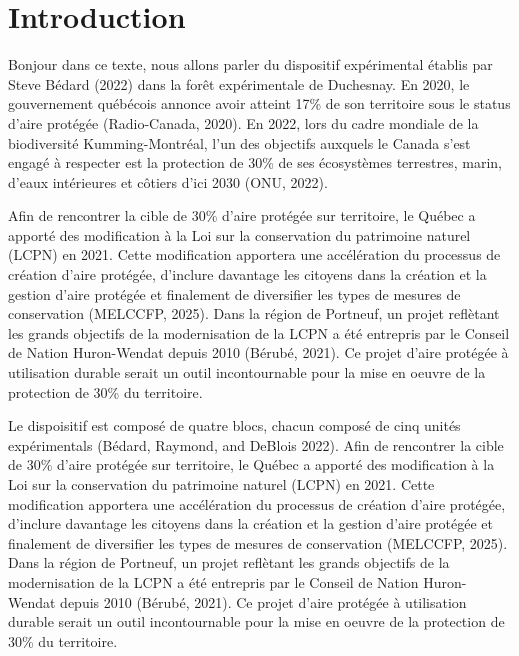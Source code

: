 \documentclass[
  12pt,
]{article}
\renewcommand*\contentsname{Table of contents}
\newcommand\contentsname{Table of contents}
\renewcommand*\listfigurename{List of Figures}
\newcommand\listfigurename{List of Figures}
\renewcommand*\listtablename{List of Tables}
\newcommand\listtablename{List of Tables}
\renewcommand*\figurename{Figure}
\newcommand\figurename{Figure}
\renewcommand*\tablename{Table}
\newcommand\tablename{Table}
\begin{document}

\renewcommand*\contentsname{Table des matieres}
\tableofcontents

\newpage

\renewcommand\listfigurename{Liste des figures}
\listoffigures

\renewcommand\listtablename{Liste des tableaux}
\listoftables

\newpage

\setcounter{page}{1}
\renewcommand\tablename{Tableau}
\renewcommand\figurename{Figure}
\section{Introduction}\label{introduction}

Bonjour dans ce texte, nous allons parler du dispositif expérimental
établis par Steve Bédard (2022) dans la forêt expérimentale de
Duchesnay. En 2020, le gouvernement québécois annonce avoir atteint 17\%
de son territoire sous le status d'aire protégée (Radio-Canada, 2020).
En 2022, lors du cadre mondiale de la biodiversité Kumming-Montréal,
l'un des objectifs auxquels le Canada s'est engagé à respecter est la
protection de 30\% de ses écosystèmes terrestres, marin, d'eaux
intérieures et côtiers d'ici 2030 (ONU, 2022).

Afin de rencontrer la cible de 30\% d'aire protégée sur territoire, le
Québec a apporté des modification à la Loi sur la conservation du
patrimoine naturel (LCPN) en 2021. Cette modification apportera une
accélération du processus de création d'aire protégée, d'inclure
davantage les citoyens dans la création et la gestion d'aire protégée et
finalement de diversifier les types de mesures de conservation (MELCCFP,
2025). Dans la région de Portneuf, un projet reflètant les grands
objectifs de la modernisation de la LCPN a été entrepris par le Conseil
de Nation Huron-Wendat depuis 2010 (Bérubé, 2021). Ce projet d'aire
protégée à utilisation durable serait un outil incontournable pour la
mise en oeuvre de la protection de 30\% du territoire.

Le dispoisitif est composé de quatre blocs, chacun composé de cinq
unités expérimentals (Bédard, Raymond, and DeBlois 2022). Afin de
rencontrer la cible de 30\% d'aire protégée sur territoire, le Québec a
apporté des modification à la Loi sur la conservation du patrimoine
naturel (LCPN) en 2021. Cette modification apportera une accélération du
processus de création d'aire protégée, d'inclure davantage les citoyens
dans la création et la gestion d'aire protégée et finalement de
diversifier les types de mesures de conservation (MELCCFP, 2025). Dans
la région de Portneuf, un projet reflètant les grands objectifs de la
modernisation de la LCPN a été entrepris par le Conseil de Nation
Huron-Wendat depuis 2010 (Bérubé, 2021). Ce projet d'aire protégée à
utilisation durable serait un outil incontournable pour la mise en
oeuvre de la protection de 30\% du territoire.
\end{document}
